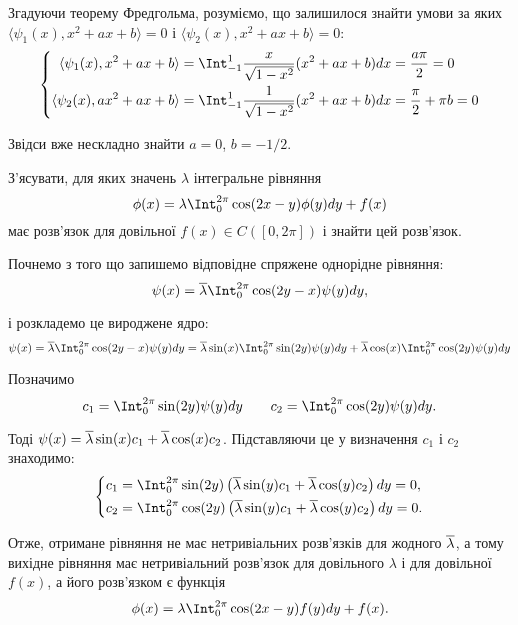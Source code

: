 \begin{solution}
    Згадуючи теорему Фредгольма, розуміємо, що залишилося знайти умови за яких $\langle \psi_1(x), x^2 + ax + b\rangle = 0$ і $\langle \psi_2(x), x^2 + ax + b\rangle = 0$:
    \begin{equation*}
        \left\{
            \begin{aligned}
                \langle \psi_1(x), x^2 + ax + b\rangle &= \Int_{-1}^1 \dfrac{x}{\sqrt{1 - x^2}} (x^2 + ax + b) dx = \dfrac {a\pi} 2 = 0 \\
                \langle \psi_2(x), ax^2 + ax + b\rangle &= \Int_{-1}^1 \dfrac{1}{\sqrt{1 - x^2}} (x^2 + ax + b) dx = \dfrac \pi 2 + \pi b = 0 \\
            \end{aligned}
        \right.
    \end{equation*}
    
    Звідси вже нескладно знайти $a = 0$, $b = - 1 / 2$.
\end{solution}

\begin{problem}[5.21, Владимиров]
    З'ясувати, для яких значень $\lambda$ інтегральне рівняння 
    \[
        \phi(x) = \lambda \Int_0^{2\pi} \cos (2x - y) \phi(y) dy + f(x)
    \]
    має розв'язок для довільної $f(x) \in C([0, 2\pi])$ і знайти цей розв'язок.
\end{problem}

\begin{solution}
    Почнемо з того що запишемо відповідне спряжене однорідне рівняння:
    \[
        \psi(x) = \conjlambda \Int_0^{2 \pi} \cos(2y - x) \psi(y) dy,
    \]
    
    і розкладемо це вироджене ядро:
    \[
        \psi(x) = \conjlambda \Int_0^{2 \pi} \cos(2y - x) \psi(y) dy = \conjlambda \sin (x) \Int_0^{2 \pi} \sin (2y) \psi(y) dy + \conjlambda \cos (x) \Int_0^{2 \pi} \cos (2y) \psi(y) dy
    \]
    
    Позначимо
    \[ 
        c_1 = \Int_0^{2 \pi} \sin (2y) \psi(y) dy \qquad c_2 = \Int_0^{2 \pi} \cos (2y) \psi(y) dy.
    \]
    
    Тоді $\psi(x) = \overline{\lambda} \sin (x) c_1 + \overline{\lambda} \cos (x) c_2$. Підставляючи це у визначення $c_1$ і $c_2$ знаходимо:
    \begin{equation*}
        \left\{
            \begin{aligned}
                c_1 &= \Int_0^{2\pi} \sin (2y) \left( \conjlambda \sin (y) c_1 + \conjlambda \cos (y) c_2 \right) dy = 0, \\ 
                c_2 &= \Int_0^{2\pi} \cos (2y) \left( \conjlambda \sin (y) c_1 + \conjlambda \cos (y) c_2 \right) dy = 0.
            \end{aligned}
        \right.
    \end{equation*}
    
    Отже, отримане рівняння не має нетривіальних розв'язків для жодного $\overline{\lambda}$, а тому вихідне рівняння має нетривіальний розв'язок для довільного $\lambda$ і для довільної $f(x)$, а його розв'язком є функція
    \[ 
    \phi(x) = \lambda \Int_0^{2\pi} \cos (2x - y) f(y) dy + f(x).
    \]
    
\end{solution}
